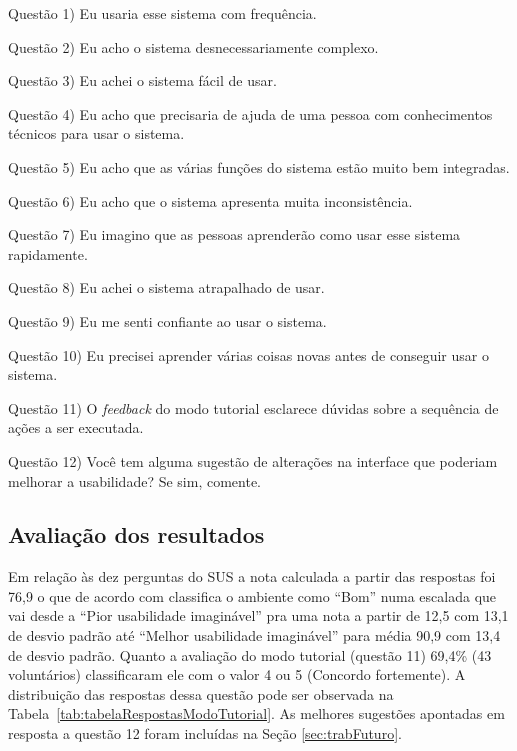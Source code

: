 Questão 1) Eu usaria esse sistema com frequência.

Questão 2) Eu acho o sistema desnecessariamente complexo.

Questão 3) Eu achei o sistema fácil de usar.

Questão 4) Eu acho que precisaria de ajuda de uma pessoa com conhecimentos técnicos para usar o sistema.

Questão 5) Eu acho que as várias funções do sistema estão muito bem integradas.

Questão 6) Eu acho que o sistema apresenta muita inconsistência.

Questão 7) Eu imagino que as pessoas aprenderão como usar esse sistema rapidamente.

Questão 8) Eu achei o sistema atrapalhado de usar.

Questão 9) Eu me senti confiante ao usar o sistema.

Questão 10) Eu precisei aprender várias coisas novas antes de conseguir usar o sistema.

Questão 11) O \textit{feedback} do modo tutorial esclarece dúvidas sobre a sequência de ações a ser executada.

Questão 12) Você tem alguma sugestão de alterações na interface que poderiam melhorar a usabilidade? Se sim, comente.

\subsection{Avaliação dos resultados}
\label{sec:avaliacaoUsabilidde}

Em relação às dez perguntas do \acrshort{SUS} a nota calculada a partir das respostas foi 76,9 o que de acordo com \textcite{BangorAaron2009} classifica o ambiente como ``Bom'' numa escalada que vai desde a ``Pior usabilidade imaginável'' pra uma nota a partir de 12,5 com 13,1 de desvio padrão até ``Melhor usabilidade imaginável'' para média 90,9 com 13,4 de desvio padrão. 
Quanto a avaliação do modo tutorial (questão 11) 69,4\% (43 voluntários) classificaram ele com o valor 4 ou 5 (Concordo fortemente). A distribuição das respostas dessa questão pode ser observada na Tabela~\ref{tab:tabelaRespostasModoTutorial}. As melhores sugestões apontadas em resposta a questão 12 foram incluídas na Seção \ref{sec:trabFuturo}.

